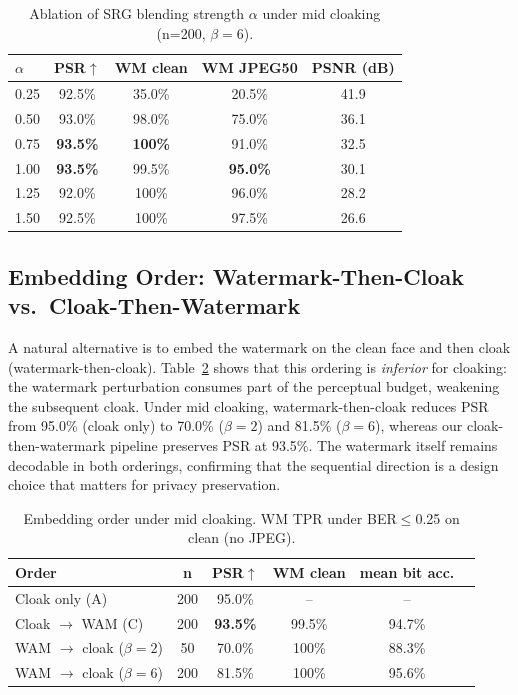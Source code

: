 \documentclass[preprint,12pt]{elsarticle}
\begin{document}
\begin{table}[t]
\caption{Ablation of SRG blending strength $\alpha$ under mid cloaking (n=200, $\beta{=}6$).}
\label{tab:alpha}
\centering
\small
\begin{tabular}{lcccc}
\toprule
$\alpha$ & PSR$\uparrow$ & WM clean & WM JPEG50 & PSNR (dB) \\
\midrule
0.25 & 92.5\% & 35.0\% & 20.5\% & 41.9 \\
0.50 & 93.0\% & 98.0\% & 75.0\% & 36.1 \\
0.75 & \textbf{93.5\%} & \textbf{100\%} & 91.0\% & 32.5 \\
1.00 & \textbf{93.5\%} & 99.5\% & \textbf{95.0\%} & 30.1 \\
1.25 & 92.0\% & 100\% & 96.0\% & 28.2 \\
1.50 & 92.5\% & 100\% & 97.5\% & 26.6 \\
\bottomrule
\end{tabular}
\end{table}

\subsection{Embedding Order: Watermark-Then-Cloak vs.\ Cloak-Then-Watermark}
\label{sec:order}
A natural alternative is to embed the watermark on the clean face and then cloak (watermark-then-cloak). Table~\ref{tab:order} shows that this ordering is \emph{inferior} for cloaking: the watermark perturbation consumes part of the perceptual budget, weakening the subsequent cloak. Under mid cloaking, watermark-then-cloak reduces PSR from 95.0\% (cloak only) to 70.0\% ($\beta{=}2$) and 81.5\% ($\beta{=}6$), whereas our cloak-then-watermark pipeline preserves PSR at 93.5\%. The watermark itself remains decodable in both orderings, confirming that the sequential direction is a design choice that matters for privacy preservation.

\begin{table}[t]
\caption{Embedding order under mid cloaking. WM TPR under BER$\le$0.25 on clean (no JPEG).}
\label{tab:order}
\centering
\small
\begin{tabular}{lccccc}
\toprule
Order & n & PSR$\uparrow$ & WM clean & mean bit acc. \\
\midrule
Cloak only (A)             & 200 & 95.0\% & --    & -- \\
Cloak $\rightarrow$ WAM (C)  & 200 & \textbf{93.5\%} & 99.5\% & 94.7\% \\
WAM $\rightarrow$ cloak ($\beta{=}2$) & 50  & 70.0\% & 100\% & 88.3\% \\
WAM $\rightarrow$ cloak ($\beta{=}6$) & 200 & 81.5\% & 100\% & 95.6\% \\
\bottomrule
\end{tabular}
\end{table}
\end{document}
